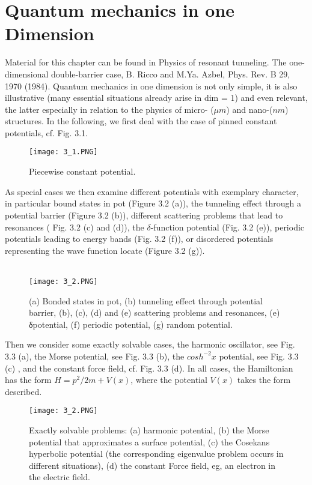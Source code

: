 \chapter{Quantum mechanics in one Dimension}
Material for this chapter can be found in Physics of resonant tunneling. The one-dimensional double-barrier case, B. Ricco and M.Ya. Azbel, Phys. Rev. B 29, 1970 (1984).
Quantum mechanics in one dimension is not only simple, it is also illustrative (many essential situations already arise in dim = 1) and even relevant, the latter especially in relation to the physics of micro- ($\mu m$) and nano-($nm$) structures. In the following, we first deal with the case of pinned constant potentials, cf. Fig. 3.1.
\begin{figure}[ht]
    \centering
    \texttt{[image: 3\_1.PNG]}
    \caption{Piecewise constant potential.}
    \label{fig:3_1}
\end{figure}
As special cases we then examine different potentials with exemplary character, in particular bound states in pot (Figure 3.2 (a)), the tunneling effect through a potential barrier (Figure 3.2 (b)), different scattering problems that lead to resonances ( Fig. 3.2 (c) and (d)), the $\delta$-function potential (Fig. 3.2 (e)), periodic potentials leading to energy bands (Fig. 3.2 (f)), or disordered potentials representing the wave function locate (Figure 3.2 (g)).\\\\
\begin{figure}[ht]
    \centering
    \texttt{[image: 3\_2.PNG]}
    \caption{(a) Bonded states in pot, (b) tunneling effect through potential barrier, (b), (c), (d) and (e) scattering problems and resonances, (e) δpotential, (f) periodic potential, (g) random potential.}
    \label{fig:3_2}
\end{figure}
Then we consider some exactly solvable cases, the harmonic oscillator, see Fig. 3.3 (a), the Morse potential, see Fig. 3.3 (b), the $cosh^{-2} x$ potential, see Fig. 3.3 (c) , and the constant force field, cf. Fig. 3.3 (d). In all cases, the Hamiltonian has the form $H = p^2 / 2m + V (x)$, where the potential $V (x)$ takes the form described.
\begin{figure}[ht]
    \centering
    \texttt{[image: 3\_2.PNG]}
    \caption{Exactly solvable problems: (a) harmonic potential, (b) the Morse potential that approximates a surface potential, (c) the Cosekans hyperbolic potential (the corresponding eigenvalue problem occurs in different situations), (d) the constant Force field, eg, an electron in the electric field.}
    \label{fig:3_3}
\end{figure}

